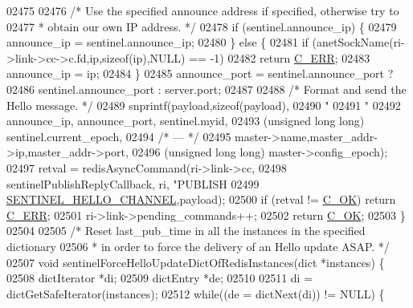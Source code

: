 \begin{DoxyCode}
{{{{{{{{{{{{{{{{{{{{{{{{{{{{{{{{{{{{{{{{{{{{{{{{{{{{{{02475 
02476     \textcolor{comment}{/* Use the specified announce address if specified, otherwise try to}
02477 \textcolor{comment}{     * obtain our own IP address. */}
02478     \textcolor{keywordflow}{if} (sentinel.announce\_ip) \{
02479         announce\_ip = sentinel.announce\_ip;
02480     \} \textcolor{keywordflow}{else} \{
02481         \textcolor{keywordflow}{if} (anetSockName(ri->link->cc->c.fd,ip,\textcolor{keyword}{sizeof}(ip),NULL) == -1)
02482             \textcolor{keywordflow}{return} \hyperlink{server_8h_af98ac28d5f4d23d7ed5985188e6fb7d1}{C\_ERR};
02483         announce\_ip = ip;
02484     \}
02485     announce\_port = sentinel.announce\_port ?
02486                     sentinel.announce\_port : server.port;
02487 
02488     \textcolor{comment}{/* Format and send the Hello message. */}
02489     snprintf(payload,\textcolor{keyword}{sizeof}(payload),
02490         \textcolor{stringliteral}{"%
02491         \textcolor{stringliteral}{"%
02492         announce\_ip, announce\_port, sentinel.myid,
02493         (\textcolor{keywordtype}{unsigned} \textcolor{keywordtype}{long} \textcolor{keywordtype}{long}) sentinel.current\_epoch,
02494         \textcolor{comment}{/* --- */}
02495         master->name,master\_addr->ip,master\_addr->port,
02496         (\textcolor{keywordtype}{unsigned} \textcolor{keywordtype}{long} \textcolor{keywordtype}{long}) master->config\_epoch);
02497     retval = redisAsyncCommand(ri->link->cc,
02498         sentinelPublishReplyCallback, ri, \textcolor{stringliteral}{"PUBLISH %
02499             \hyperlink{sentinel_8c_aa57e3638aae4eec03d29f247b1611569}{SENTINEL\_HELLO\_CHANNEL},payload);
02500     \textcolor{keywordflow}{if} (retval != \hyperlink{server_8h_a303769ef1065076e68731584e758d3e1}{C\_OK}) \textcolor{keywordflow}{return} \hyperlink{server_8h_af98ac28d5f4d23d7ed5985188e6fb7d1}{C\_ERR};
02501     ri->link->pending\_commands++;
02502     \textcolor{keywordflow}{return} \hyperlink{server_8h_a303769ef1065076e68731584e758d3e1}{C\_OK};
02503 \}
02504 
02505 \textcolor{comment}{/* Reset last\_pub\_time in all the instances in the specified dictionary}
02506 \textcolor{comment}{ * in order to force the delivery of an Hello update ASAP. */}
02507 \textcolor{keywordtype}{void} sentinelForceHelloUpdateDictOfRedisInstances(dict *instances) \{
02508     dictIterator *di;
02509     dictEntry *de;
02510 
02511     di = dictGetSafeIterator(instances);
02512     \textcolor{keywordflow}{while}((de = dictNext(di)) != NULL) \{
}}}}}}}}}}}}}}}}}}}}}}}}}}}}}}}}}}}}}}}}}}}}}}}}}}}}}}}}}
\end{DoxyCode}
